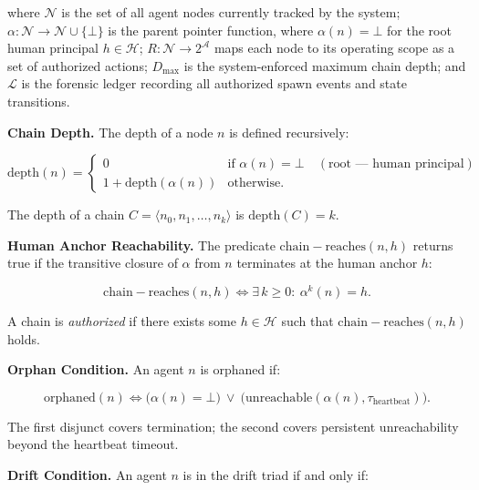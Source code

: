 where $\mathcal{N}$ is the set of all agent nodes currently tracked by the system; $\alpha: \mathcal{N} \rightarrow \mathcal{N} \cup \{\bot\}$ is the parent pointer function, where $\alpha(n) = \bot$ for the root human principal $h \in \mathcal{H}$; $R: \mathcal{N} \rightarrow 2^{\mathcal{A}}$ maps each node to its operating scope as a set of authorized actions; $D_{\max}$ is the system-enforced maximum chain depth; and $\mathcal{L}$ is the forensic ledger recording all authorized spawn events and state transitions.

\medskip
\noindent\textbf{Chain Depth.}
The depth of a node $n$ is defined recursively:

\begin{equation}
\mathrm{depth}(n) = 
\begin{cases}
0 & \text{if } \alpha(n) = \bot \quad (\text{root — human principal}) \\
1 + \mathrm{depth}(\alpha(n)) & \text{otherwise}.
\end{cases}
\label{eq:rs-depth}
\end{equation}

The depth of a chain $C = \langle n_0, n_1, \ldots, n_k \rangle$ is $\mathrm{depth}(C) = k$.

\medskip
\noindent\textbf{Human Anchor Reachability.}
The predicate $\mathrm{chain-reaches}(n, h)$ returns true if the transitive closure of $\alpha$ from $n$ terminates at the human anchor $h$:

\begin{equation}
\mathrm{chain-reaches}(n, h) \iff \exists\, k \geq 0:\ \alpha^{k}(n) = h.
\label{eq:rs-chain-reaches}
\end{equation}

A chain is \emph{authorized} if there exists some $h \in \mathcal{H}$ such that $\mathrm{chain-reaches}(n, h)$ holds.

\medskip
\noindent\textbf{Orphan Condition.}
An agent $n$ is orphaned if:

\begin{equation}
\mathrm{orphaned}(n) \iff \bigl( \alpha(n) = \bot \bigr)\ \lor\ \bigl( \mathrm{unreachable}(\alpha(n), \tau_{\mathrm{heartbeat}}) \bigr).
\label{eq:rs-orphaned}
\end{equation}

The first disjunct covers termination; the second covers persistent unreachability beyond the heartbeat timeout.

\medskip
\noindent\textbf{Drift Condition.}
An agent $n$ is in the drift triad if and only if:

